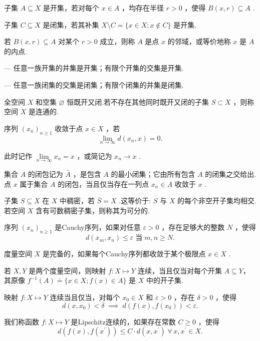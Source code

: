 子集 $A \subseteq  X$ 是开集，若对每个 $x \in  A$ ，均存在半径 $r > 0$ ，使得 $B\left( {x,r}\right)  \subseteq  A$ .

子集 $C \subseteq  X$ 是闭集，若其补集 $X \setminus  C = \{ x \in  X;x \notin  C\}$ 是开集.

若 $B\left( {x,r}\right)  \subseteq  A$ 对某个 $r > 0$ 成立，则称 $A$ 是点 $x$ 的邻域，或等价地称 $x$ 是 $A$ 的内点.

— 任意一族开集的并集是开集；有限个开集的交集是开集.

— 任意一族闭集的交集是闭集；有限个闭集的并集是闭集.

全空间 $X$ 和空集 $\varnothing$ 恒既开又闭.若不存在其他同时既开又闭的子集 $S \subset  X$ ，则称空间 $X$ 是连通的.

序列 ${\left( {x}_{n}\right) }_{n \geq  1}$ 收敛于点 $x \in  X$ ，若
\[
\mathop{\lim }\limits_{{n \rightarrow  \infty }}d\left( {{x}_{n},x}\right)  = 0.
\]

此时记作 $\mathop{\lim }\limits_{{n \rightarrow  \infty }}{x}_{n} = x$ ，或简记为 ${x}_{n} \rightarrow  x$ .

集合 $A$ 的闭包记为 $\bar{A}$ ，是包含 $A$ 的最小闭集；它由所有包含 $A$ 的闭集之交给出.点 $x$ 属于集合 $A$ 的闭包，当且仅当存在一列点 ${x}_{n} \in  A$ 收敛于 $x$ .

子集 $S \subseteq  X$ 在 $X$ 中稠密，若 $\bar{S} = X$ .这等价于: $S$ 与 $X$ 的每个非空开子集均相交.若空间 $X$ 含有可数稠密子集，则称其为可分的.

序列 ${\left( {x}_{n}\right) }_{n \geq  1}$ 是Cauchy序列，如果对任意 $\varepsilon  > 0$ ，存在足够大的整数 $N$ ，使得
\[
d\left( {{x}_{m},{x}_{n}}\right)  \leq  \varepsilon \;\text{当}\; m,n \geq  N.
\]

度量空间 $X$ 是完备的，如果每个Cauchy序列都收敛于某个极限点 $x \in  X$ .

若 $X,Y$ 是两个度量空间，则映射 $f : X \mapsto  Y$ 连续，当且仅当对每个开集 $A \subseteq  Y$，其原像 ${f}^{-1}\left( A\right)  \doteq  \{ x \in  X;f\left( x\right)  \in  A\}$ 是 $X$ 中的开子集.

映射 $f : X \mapsto  Y$ 连续当且仅当，对每个 ${x}_{0} \in  X$ 和 $\varepsilon  > 0$ ，存在 $\delta  > 0$ ，使得
\[
d\left( {x,{x}_{0}}\right)  < \delta \;\implies \;d\left( {f\left( x\right) ,f\left( {x}_{0}\right) }\right)  < \varepsilon .
\]

我们称函数 $f : X \mapsto  Y$ 是Lipschitz连续的，如果存在常数 $C \geq  0$ ，使得
\[
d\left( {f\left( x\right) ,f\left( {x}^{\prime }\right) }\right)  \leq  C \cdot  d\left( {x,{x}^{\prime }}\right) \;\forall\,x,{x}^{\prime } \in  X.
\]

